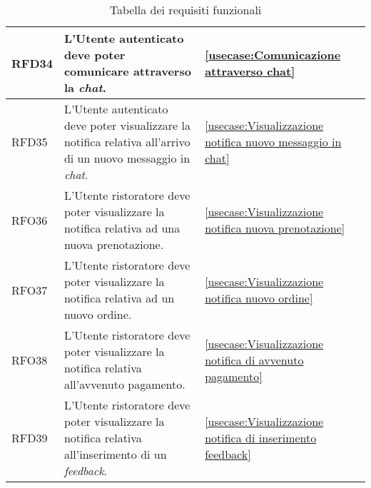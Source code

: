 \begin{table}[H]
\begin{tabularx}{\textwidth}{l|X|p{2cm}}
		\hline
		RFD34       & L'Utente autenticato deve poter comunicare attraverso la \textit{chat}.                                              & \autoref{usecase:Comunicazione attraverso chat}                                               \\
		\hline
		RFD35       & L'Utente autenticato deve poter visualizzare la notifica relativa all'arrivo di un nuovo messaggio in \textit{chat}. & \autoref{usecase:Visualizzazione notifica nuovo messaggio in chat}                            \\
		\hline
		RFO36       & L'Utente ristoratore deve poter visualizzare la notifica relativa ad una nuova prenotazione.                         & \autoref{usecase:Visualizzazione notifica nuova prenotazione}                                 \\
		\hline
		RFO37       & L'Utente ristoratore deve poter visualizzare la notifica relativa ad un nuovo ordine.                                & \autoref{usecase:Visualizzazione notifica nuovo ordine}                                       \\
		\hline
		RFO38       & L'Utente ristoratore deve poter visualizzare la notifica relativa all'avvenuto pagamento.                            & \autoref{usecase:Visualizzazione notifica di avvenuto pagamento}                              \\
		\hline
		RFD39       & L'Utente ristoratore deve poter visualizzare la notifica relativa all'inserimento di un \textit{feedback}.           & \autoref{usecase:Visualizzazione notifica di inserimento feedback}                            \\
	\end{tabularx}
	\caption{Tabella dei requisiti funzionali}
\end{table}


